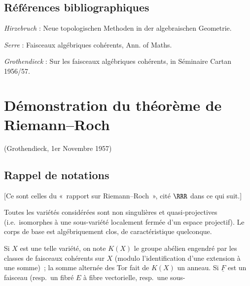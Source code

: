 \subsection*{Références bibliographiques}
\begin{enumerate}[label={[\arabic*]}]
\item \emph{Hirzebruch} : Neue topologischen Methoden in der algebraischen Geometrie.
\item \emph{Serre} : Faisceaux algébriques cohérents, Ann. of Maths.
\item \emph{Grothendieck} : Sur les faisceaux algébriques cohérents, in Séminaire Cartan 1956/57.
\end{enumerate}

\section*{Démonstration du théorème de Riemann--Roch}
\begin{center}
(Grothendieck, 1er Novembre 1957)
\end{center}

\subsection*{Rappel de notations\footnotemark}
[Ce sont celles du «~rapport sur Riemann--Roch~», cité \(\RRR\) dans ce qui suit.]

Toutes les variétés considérées sont non singulières et quasi-projectives (i.e.\ isomorphes à une sous-variété localement fermée d'un espace projectif). Le corps de base est algébriquement clos, de caractéristique quelconque.

Si \(X\) est une telle variété, on note \(K(X)\) le groupe abélien engendré par les classes de faisceaux cohérents sur \(X\) (modulo l'identification d'une extension à une somme)~; la somme alternée des Tor fait de \(K(X)\) un anneau. Si \(\underline F\) est un faisceau (resp.\ un fibré \(E\) à fibre vectorielle, resp.\ une sous-
